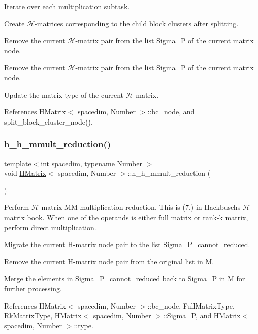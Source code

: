 Iterate over each multiplication subtask.

Create $\mathcal{H}$-\/matrices corresponding to the child block clusters after splitting.

Remove the current $\mathcal{H}$-\/matrix pair from the list {\ttfamily Sigma\+\_\+P} of the current matrix node.

Remove the current $\mathcal{H}$-\/matrix pair from the list {\ttfamily Sigma\+\_\+P} of the current matrix node.

Update the matrix type of the current $\mathcal{H}$-\/matrix.

References H\+Matrix$<$ spacedim, Number $>$\+::bc\+\_\+node, and split\+\_\+block\+\_\+cluster\+\_\+node().

\mbox{\label{classHMatrix_a168b6eea2e5b27528497850bf5ee2bbe}} 
\subsubsection{\texorpdfstring{h\+\_\+h\+\_\+mmult\+\_\+reduction()}{h\_h\_mmult\_reduction()}}
{\footnotesize\ttfamily template$<$int spacedim, typename Number $>$ \\
void \hyperlink{classHMatrix}{H\+Matrix}$<$ spacedim, Number $>$\+::h\+\_\+h\+\_\+mmult\+\_\+reduction (\begin{DoxyParamCaption}{ }\end{DoxyParamCaption})}

Perform $\mathcal{H}$-\/matrix MM multiplication reduction. This is (7.) in Hackbusch\textquotesingle{}s $\mathcal{H}$-\/matrix book. When one of the operands is either full matrix or rank-\/k matrix, perform direct multiplication.

Migrate the current H-\/matrix node pair to the list {\ttfamily Sigma\+\_\+\+P\+\_\+cannot\+\_\+reduced}.

Remove the current H-\/matrix node pair from the original list in {\ttfamily M}.

Merge the elements in {\ttfamily Sigma\+\_\+\+P\+\_\+cannot\+\_\+reduced} back to {\ttfamily Sigma\+\_\+P} in {\ttfamily M} for further processing.

References H\+Matrix$<$ spacedim, Number $>$\+::bc\+\_\+node, Full\+Matrix\+Type, Rk\+Matrix\+Type, H\+Matrix$<$ spacedim, Number $>$\+::\+Sigma\+\_\+P, and H\+Matrix$<$ spacedim, Number $>$\+::type.




